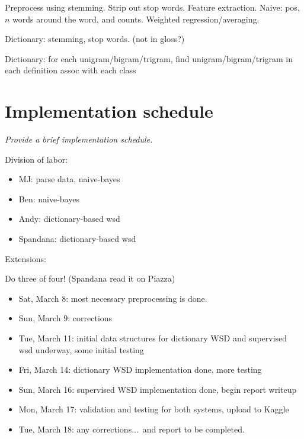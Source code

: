 \documentclass{article}
\begin{document}
Preprocess using stemming. Strip out stop words. Feature extraction. Naive: pos, $n$ words around the word, and counts. Weighted regression/averaging.

Dictionary: stemming, stop words. (not in gloss?)

Dictionary: for each unigram/bigram/trigram, find unigram/bigram/trigram in each definition assoc with each class

\section{Implementation schedule}
\textit{Provide a brief implementation schedule.}\par

Division of labor:
\begin{itemize}[noitemsep]
\item MJ: parse data, naive-bayes
\item Ben: naive-bayes
\item Andy: dictionary-based wsd
\item Spandana: dictionary-based wsd
\end{itemize}

Extensions:\par
Do three of four! (Spandana read it on Piazza)

\begin{itemize}[noitemsep]
\item Sat, March 8: most necessary preprocessing is done.
\item Sun, March 9: corrections
\item Tue, March 11: initial data structures for dictionary WSD and supervised wsd underway, some initial testing
\item Fri, March 14: dictionary WSD implementation done, more testing
\item Sun, March 16: supervised WSD implementation done, begin report writeup
\item Mon, March 17: validation and testing for both systems, upload to Kaggle
\item Tue, March 18: any corrections...\ and report to be completed.
\end{itemize}
\end{document}

